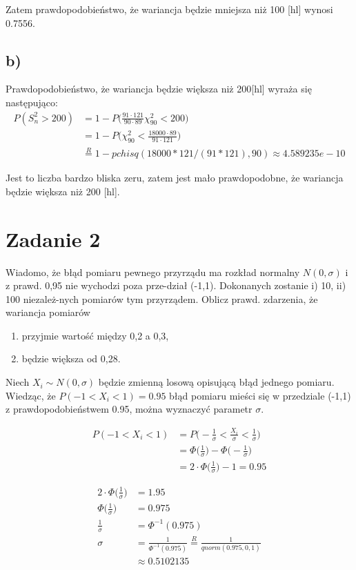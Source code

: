 \documentclass{article}
\begin{document}
Zatem prawdopodobieństwo, że wariancja będzie mniejsza niż 100 [hl] wynosi 0.7556.

\subsection*{b)}
Prawdopodobieństwo, że wariancja będzie większa niż 200[hl] wyraża się następująco:
\begin{align*}
P(S_n^2 > 200) & = 1 - P\Big( \frac{91\cdot 121}{90\cdot 89} \chi_{90}^2 < 200 \Big) \\
& = 1 - P\Big( \chi_{90}^2 < \frac{18000\cdot 89}{91\cdot 121} \Big) \\
& \overset{R}{=} 1 - pchisq(18000*121/(91*121), 90) \approx 4.589235e-10
\end{align*}

Jest to liczba bardzo bliska zeru, zatem jest mało prawdopodobne, że wariancja będzie większa niż 200 [hl].

\newpage
\section{Zadanie 2}
Wiadomo, że błąd pomiaru pewnego przyrządu ma rozkład normalny $N(0,\sigma)$ i z prawd. 0,95 nie wychodzi poza prze-dział (-1,1). Dokonanych zostanie i) 10, ii) 100 niezależ-nych pomiarów tym przyrządem. Oblicz prawd. zdarzenia, że wariancja pomiarów
\begin{enumerate}[label = \alph*)]
\item przyjmie wartość między 0,2 a 0,3,
\item będzie większa od 0,28.
\end{enumerate}


Niech $X_i \sim N(0,\sigma)$ będzie zmienną losową opisującą błąd jednego pomiaru. \\
Wiedząc, że $P(-1<X_i<1) = 0.95$ błąd pomiaru mieści się w przedziale (-1,1) z prawdopodobieństwem 0.95, można wyznaczyć parametr $\sigma$.

\begin{align*}
P(-1<X_i<1) & = P\Big( -\frac{1}{\sigma} < \frac{X_i}{\sigma} < \frac{1}{\sigma}\Big) \\
& = \Phi\Big(\frac{1}{\sigma}\Big) - \Phi\Big(-\frac{1}{\sigma}\Big) \\
& = 2\cdot\Phi\Big(\frac{1}{\sigma}\Big) - 1 = 0.95
\end{align*}

\begin{align*}
2\cdot\Phi\Big(\frac{1}{\sigma}\Big)  & = 1.95 \\
\Phi\Big(\frac{1}{\sigma}\Big) & = 0.975 \\
\frac{1}{\sigma} & = \Phi^{-1}(0.975) \\
\sigma & = \frac{1}{\Phi^{-1}(0.975)} \overset{R}{=} \frac{1}{qnorm(0.975,0,1)} \\
& \approx 0.5102135
\end{align*}
\end{document}
